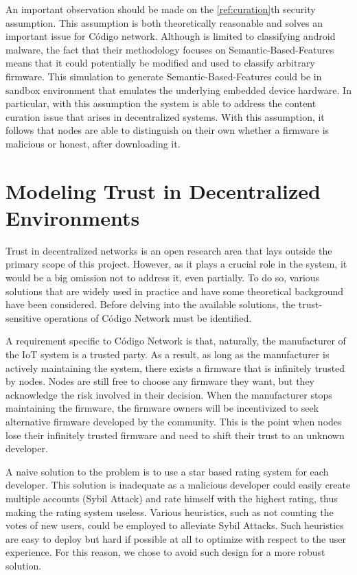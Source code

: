 {{An important observation should be made on the \ref{ref:curation}th security assumption. This assumption is both theoretically reasonable and solves an important issue for Código network. Although \cite{aspinall} is limited to classifying android malware, the fact that their methodology focuses on Semantic-Based-Features means that it could potentially be modified and used to classify arbitrary firmware. This simulation to generate Semantic-Based-Features could be in sandbox environment that emulates the underlying embedded device hardware. In particular, with this assumption the system is able to address the content curation issue that arises in decentralized systems. With this assumption, it follows that nodes are able to distinguish on their own whether a firmware is malicious or honest, after downloading it.

}

\section{Modeling Trust in Decentralized Environments}{

Trust in decentralized networks is an open research area that lays outside the primary scope of this project. However, as it plays a crucial role in the system, it would be a big omission not to address it, even partially. To do so, various solutions that are widely used in practice and have some theoretical background have been considered. Before delving into the available solutions, the trust-sensitive operations of Código Network must be identified.

A requirement specific to Código Network is that, naturally, the manufacturer of the IoT system is a trusted party. As a result, as long as the manufacturer is actively maintaining the system, there exists a firmware that is infinitely trusted by nodes. Nodes are still free to choose any firmware they want, but they acknowledge the risk involved in their decision. When the manufacturer stops maintaining the firmware, the firmware owners will be incentivized to seek alternative firmware developed by the community. This is the point when nodes lose their infinitely trusted firmware and need to shift their trust to an unknown developer.

A naive solution to the problem is to use a star based rating system for each developer. This solution is inadequate as a malicious developer could easily create multiple accounts (Sybil Attack) and rate himself with the highest rating, thus making the rating system useless. Various heuristics, such as not counting the votes of new users, could be employed to alleviate Sybil Attacks. Such heuristics are easy to deploy but hard if possible at all to optimize with respect to the user experience. For this reason, we chose to avoid such design for a more robust solution.

}}
